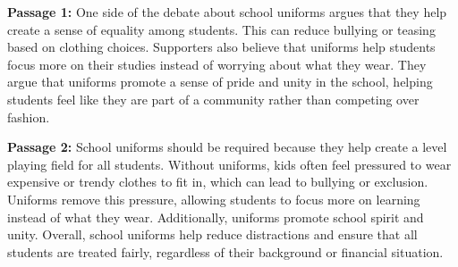 \documentclass[12pt]{article}
\begin{document}
\begin{tcolorbox}[colframe=black!60, colback=white, 
coltitle=black, colbacktitle=black!15, fonttitle=\bfseries\Large, 
title=Examples, halign title=center, left=10pt, right=10pt, top=10pt, bottom=15pt]

\textbf{Passage 1:} One side of the debate about school uniforms argues that they help create a sense of equality among students. This can reduce bullying or teasing based on clothing choices. Supporters also believe that uniforms help students focus more on their studies instead of worrying about what they wear. They argue that uniforms promote a sense of pride and unity in the school, helping students feel like they are part of a community rather than competing over fashion.

\vspace{1em}

\textbf{Passage 2:} School uniforms should be required because they help create a level playing field for all students. Without uniforms, kids often feel pressured to wear expensive or trendy clothes to fit in, which can lead to bullying or exclusion. Uniforms remove this pressure, allowing students to focus more on learning instead of what they wear. Additionally, uniforms promote school spirit and unity. Overall, school uniforms help reduce distractions and ensure that all students are treated fairly, regardless of their background or financial situation.

 
\vspace{1em}
 



\end{tcolorbox}
\end{document}
